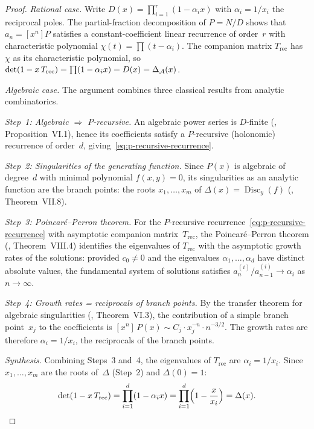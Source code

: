 \begin{proof}
\emph{Rational case.}
Write $D(x) = \prod_{i=1}^{r}(1 - \alpha_i x)$ with
$\alpha_i = 1/x_i$ the reciprocal poles.
The partial-fraction decomposition of
$P = N/D$ shows that $a_n = [x^n]P$ satisfies a
constant-coefficient linear recurrence of order~$r$
with characteristic polynomial
$\chi(t) = \prod(t - \alpha_i)$.
The companion matrix $T_{\mathrm{rec}}$ has $\chi$ as
its characteristic polynomial, so
$\det(1 - x\,T_{\mathrm{rec}}) = \prod(1 - \alpha_i x)
= D(x) = \Delta_{\mathcal{A}}(x)$.

\emph{Algebraic case.}
The argument combines three classical results from analytic
combinatorics.

\emph{Step~1: Algebraic $\Rightarrow$ $P$-recursive.}
An algebraic power series is $D$-finite
(\cite{FlajoletSedgewick}, Proposition~VI.1), hence its
coefficients satisfy a $P$-recursive (holonomic) recurrence
of order~$d$, giving~\eqref{eq:p-recursive-recurrence}.

\emph{Step~2: Singularities of the generating function.}
Since $P(x)$ is algebraic of degree~$d$ with minimal polynomial
$f(x,y) = 0$, its singularities as an analytic function are
the branch points: the roots $x_1, \ldots, x_m$ of
$\Delta(x) = \operatorname{Disc}_y(f)$
(\cite{FlajoletSedgewick}, Theorem~VII.8).

\emph{Step~3: Poincar\'e--Perron theorem.}
For the $P$-recursive recurrence~\eqref{eq:p-recursive-recurrence}
with asymptotic companion matrix~$T_{\mathrm{rec}}$, the
Poincar\'e--Perron theorem
(\cite{FlajoletSedgewick}, Theorem~VIII.4)
identifies the eigenvalues of $T_{\mathrm{rec}}$ with the
asymptotic growth rates of the solutions: provided
$c_0 \neq 0$ and the eigenvalues $\alpha_1, \ldots, \alpha_d$
have distinct absolute values, the fundamental system of
solutions satisfies
$a_n^{(i)}/a_{n-1}^{(i)} \to \alpha_i$ as $n \to \infty$.

\emph{Step~4: Growth rates = reciprocals of branch points.}
By the transfer theorem for algebraic singularities
(\cite{FlajoletSedgewick}, Theorem~VI.3), the contribution
of a simple branch point~$x_j$ to the coefficients is
$[x^n]\, P(x) \sim C_j \cdot x_j^{-n} \cdot n^{-3/2}$.
The growth rates are therefore $\alpha_i = 1/x_i$, the
reciprocals of the branch points.

\emph{Synthesis.}
Combining Steps~3 and~4, the eigenvalues of $T_{\mathrm{rec}}$
are $\alpha_i = 1/x_i$.  Since $x_1, \ldots, x_m$ are the
roots of~$\Delta$ (Step~2) and $\Delta(0) = 1$:
\[
\det(1 - x\, T_{\mathrm{rec}})
= \prod_{i=1}^d (1 - \alpha_i x)
= \prod_{i=1}^d \Bigl(1 - \frac{x}{x_i}\Bigr)
= \Delta(x). \qedhere
\]
\end{proof}

